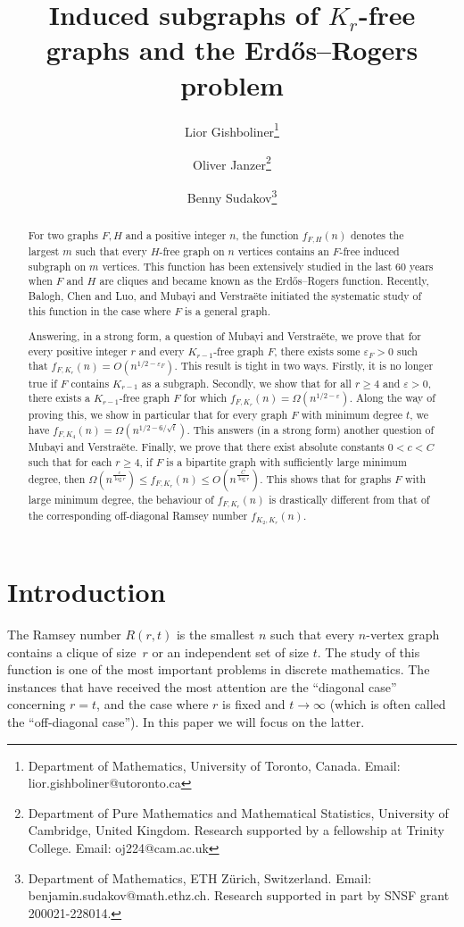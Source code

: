 \documentclass[11pt]{article}
\title{\vspace{-0.9cm}Induced subgraphs of $K_r$-free graphs and the Erd\H os--Rogers problem}
\author{
Lior Gishboliner\thanks{Department of Mathematics, University of Toronto, Canada. Email: lior.gishboliner@utoronto.ca}
\and 
Oliver Janzer\thanks{Department of Pure Mathematics and Mathematical Statistics, University of Cambridge, United Kingdom. Research supported by a fellowship at Trinity College. Email: oj224@cam.ac.uk}
\and 
Benny Sudakov\thanks{Department of Mathematics, ETH Z\"urich, Switzerland. Email: benjamin.sudakov@math.ethz.ch. Research supported in part by SNSF grant 200021-228014.}
}
\date{}
\theoremstyle{plain}
\theoremstyle{definition}
\newcommand{\eps}{\varepsilon}
\begin{document}
\maketitle

\begin{abstract}
    For two graphs $F,H$ and a positive integer $n$, the function $f_{F,H}(n)$ denotes the largest $m$ such that every $H$-free graph on $n$ vertices contains an $F$-free induced subgraph on $m$ vertices. This function has been extensively studied in the last 60 years when $F$ and $H$ are cliques and became known as the Erd\H os--Rogers function. Recently, Balogh, Chen and Luo, and Mubayi and Verstra\"ete initiated the systematic study of this function in the case where $F$ is a general graph.
    
    Answering, in a strong form, a question of Mubayi and Verstra\"ete, we prove that for every positive integer $r$ and every $K_{r-1}$-free graph $F$, there exists some $\eps_F>0$ such that $f_{F,K_r}(n)=O(n^{1/2-\eps_F})$. This result is tight in two ways. Firstly, it is no longer true if $F$ contains $K_{r-1}$ as a subgraph. Secondly, we show that for all $r\geq 4$ and $\eps>0$, there exists a $K_{r-1}$-free graph $F$ for which $f_{F,K_r}(n)=\Omega(n^{1/2-\eps})$. Along the way of proving this, we show in particular that for every graph $F$ with minimum degree $t$, we have $f_{F,K_4}(n)=\Omega(n^{1/2-6/\sqrt{t}})$. This answers (in a strong form) another question of Mubayi and Verstra\"ete. Finally, we prove that there exist absolute constants $0<c<C$ such that for each $r\geq 4$, if $F$ is a bipartite graph with sufficiently large minimum degree, then $\Omega(n^{\frac{c}{\log r}})\leq f_{F,K_r}(n)\leq O(n^{\frac{C}{\log r}})$. This shows that for graphs $F$ with large minimum degree, the behaviour of $f_{F,K_r}(n)$ is drastically different from that of the corresponding off-diagonal Ramsey number $f_{K_2,K_r}(n)$.
\end{abstract}

\section{Introduction}

The Ramsey number $R(r,t)$ is the smallest $n$ such that every $n$-vertex graph contains a clique of size~$r$ or an independent set of size $t$. The study of this function is one of the most important problems in discrete mathematics. The instances that have  received the most attention are the ``diagonal case'' concerning $r=t$, and the case where $r$ is fixed and $t\rightarrow \infty$ (which is often called the ``off-diagonal case''). In this paper we will focus on the latter.
\end{document}

